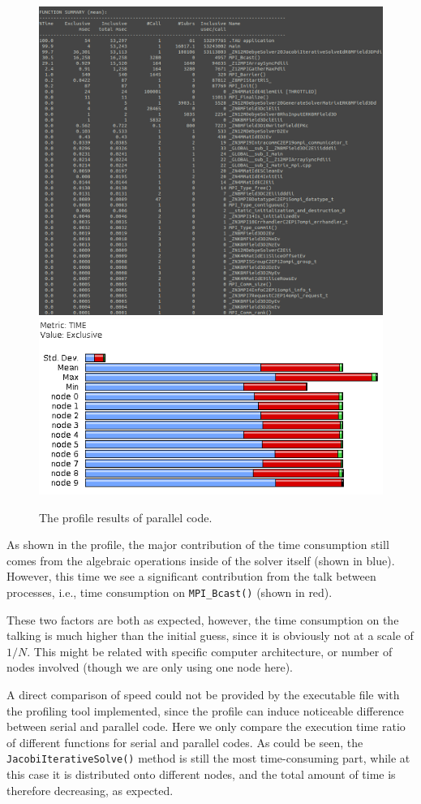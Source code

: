\documentclass{article}
\begin{document}
\begin{spacing}{1.1}
\begin{figure}[H]
  \centering
  \includegraphics[width=\linewidth]{output/mpi-previous-text.png}
  \includegraphics[width=0.6\linewidth]{output/mpi-previous.png}
  \caption{The profile results of parallel code.}
  \label{fig-testcase}
\end{figure}

As shown in the profile, the major contribution of the time consumption still comes from the algebraic operations inside of the solver itself (shown in blue). However, this time we see a significant contribution from the talk between processes, i.e., time consumption on \texttt{MPI\_Bcast()} (shown in red).

These two factors are both as expected, however, the time consumption on the talking is much higher than the initial guess, since it is obviously not at a scale of $1/N$. This might be related with specific computer architecture, or number of nodes involved (though we are only using one node here).

A direct comparison of speed could not be provided by the executable file with the profiling tool implemented, since the profile can induce noticeable difference between serial and parallel code. Here we only compare the execution time ratio of different functions for serial and parallel codes. As could be seen, the \texttt{JacobiIterativeSolve()} method is still the most time-consuming part, while at this case it is distributed onto different nodes, and the total amount of time is therefore decreasing, as expected.


\end{spacing}
\end{document}
